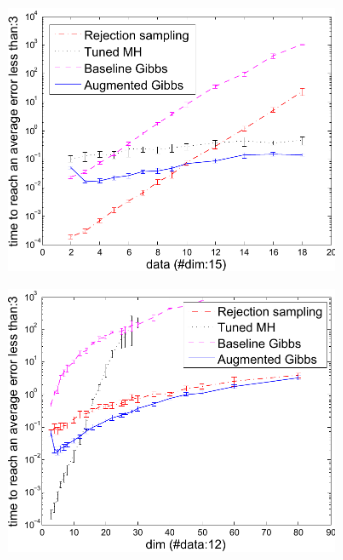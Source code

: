 \begin{figure}[thb!]
\centering
\begin{subfigure}{.49\textwidth}
  \centering
  \includegraphics[width=0.95\textwidth]{plot/bppl_data_analysis_fit.pdf}
  \caption{}
  \label{fig:error-samples-bppl}
\end{subfigure}
\begin{subfigure}{.49\textwidth}
  \centering
  \hspace{5mm} \includegraphics[width=0.95\textwidth]{plot/bppl_dim_analysis_fit.pdf}
  \caption{}
  \label{fig:error-samples-bppl}
\end{subfigure}

\end{figure}
